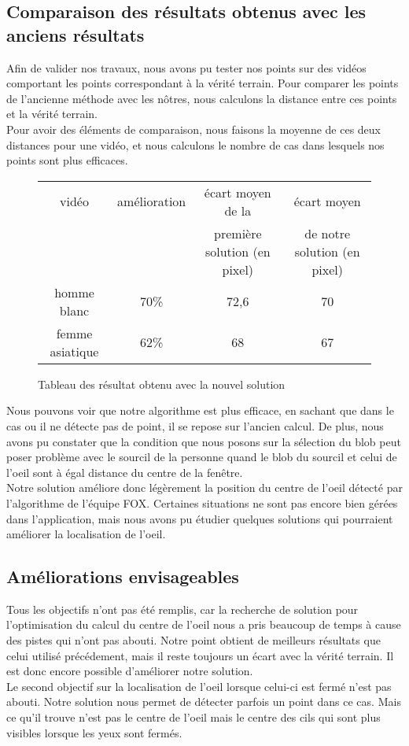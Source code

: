 \subsection{Comparaison des résultats obtenus avec les anciens résultats}
Afin de valider nos travaux, nous avons pu tester nos points sur des vidéos comportant les points correspondant à
la vérité terrain. Pour comparer les points de l'ancienne méthode avec les nôtres, nous calculons la
distance entre ces points et la vérité terrain.\\

Pour avoir des éléments de comparaison, nous faisons la moyenne de ces deux distances pour une vidéo, et nous calculons
le nombre de cas dans lesquels nos points sont plus efficaces.\\

\begin{figure}[H]
  \begin{tabular}{|c|c|c|c|}
  \hline
  vidéo & amélioration & écart moyen de la & écart moyen \\
  & & première solution (en pixel) & de notre solution (en pixel)\\
  \hline
  homme blanc & 70\% & 72,6 & 70\\
  \hline
  femme asiatique & 62\% & 68 & 67\\
  \hline
  \end{tabular}
  \caption{Tableau des résultat obtenu avec la nouvel solution}
\end{figure}

Nous pouvons voir que notre algorithme est plus efficace, en sachant que dans le cas ou il ne détecte pas de point, il se repose sur l'ancien
calcul. De plus, nous avons pu constater que la condition que nous posons sur la sélection du blob peut poser problème 
avec le sourcil de la personne quand le blob du sourcil et celui de l'oeil sont à égal distance du centre de la fenêtre.\\

Notre solution améliore donc légèrement la position du centre de l'oeil détecté par l'algorithme de l'équipe FOX. Certaines
situations ne sont pas encore bien gérées dans l'application, mais nous avons pu étudier quelques solutions qui pourraient améliorer
la localisation de l'oeil.

\subsection{Améliorations envisageables}
Tous les objectifs n'ont pas été remplis, car la recherche de solution pour l'optimisation du calcul du centre de l'oeil
nous a pris beaucoup de temps à cause des pistes qui n'ont pas abouti. Notre point obtient de meilleurs résultats
que celui utilisé précédement, mais il reste toujours un écart avec la vérité terrain. Il est donc encore possible
d'améliorer notre solution.\\

Le second objectif sur la localisation de l'oeil lorsque celui-ci est fermé n'est pas abouti. Notre solution
nous permet de détecter parfois un point dans ce cas. Mais ce qu'il trouve n'est pas le centre de l'oeil mais le
centre des cils qui sont plus visibles lorsque les yeux sont fermés.